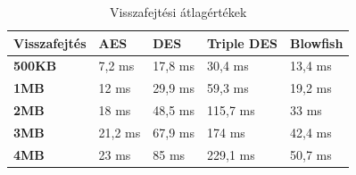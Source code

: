 \begin{table}[H]
	\centering
	\caption{Visszafejtési átlagértékek}
	\label{tab:avg_dec}
	\medskip	
	\begin{tabular}{|p{2.4cm}|p{2.7cm}|p{2.7cm}|p{2.7cm}|p{2.7cm}|}
		\hline
		\textbf{Visszafejtés}& \textbf{AES} & \textbf{DES} & \textbf{Triple DES}  & \textbf{Blowfish} \\
		\hline
		\textbf{500KB}&7,2 ms&17,8 ms&30,4 ms&13,4 ms \\
		\hline
		\textbf{1MB}&12 ms&29,9 ms&59,3 ms&19,2 ms \\
		\hline
		\textbf{2MB}&18 ms&48,5 ms&115,7 ms&33 ms \\
		\hline
		\textbf{3MB}&21,2 ms&67,9 ms&174 ms&42,4 ms \\
		\hline
		\textbf{4MB}&23 ms&85 ms&229,1 ms&50,7 ms \\
		\hline
	\end{tabular}
\end{table}


